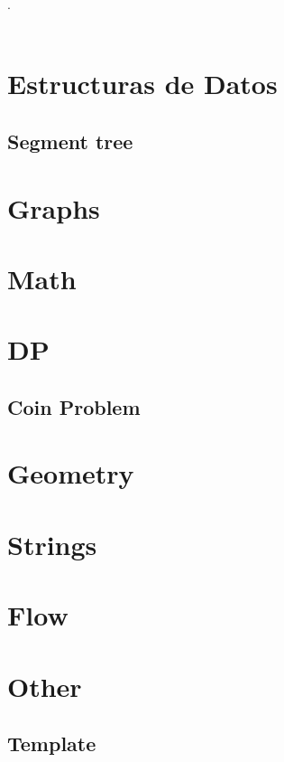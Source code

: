 

\def\title{Competitive Programing Reference}
.\\[0.2cm]
 \\[0.5cm]
\tableofcontents\newpage

\section{Estructuras de Datos}
	\subsection{Segment tree}

\section{Graphs}

\section{Math}

\section{DP}
	\subsection{Coin Problem}

\section{Geometry}


\section{Strings}


\section{Flow}


\section{Other}
	\subsection{Template}




